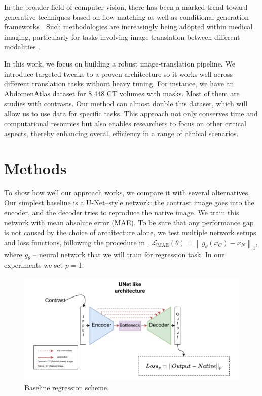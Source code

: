 \documentclass{article}
\begin{document}
In the broader field of computer vision, there has been a marked trend toward generative techniques based on flow matching \citep{albergo2022building, bilovs2021neural} as well as conditional generation frameworks \citep{lipman2022flow, tong2023improving}. Such methodologies are increasingly being adopted within medical imaging, particularly for tasks involving image translation between different modalities \citep{yazdani2025flow, reynaud2025echoflow}.

In this work, we focus on building a robust image‐translation pipeline. We introduce targeted tweaks to a proven architecture so it works well across different translation tasks without heavy tuning. 
For instance, we have an AbdomenAtlas \citep{li2024abdomenatlas} dataset for 8,448 CT volumes with masks. Most of them are studies with contrasts. Our method can almost double this dataset, which will allow us to use data for specific tasks. This approach not only conserves time and computational resources but also enables researchers to focus on other critical aspects, thereby enhancing overall efficiency in a range of clinical scenarios. 

\section{Methods}
To show how well our approach works, we compare it with several alternatives.
Our simplest baseline is a U-Net–style network: the contrast image goes into the encoder, and the decoder tries to reproduce the native image. We train this network with mean absolute error (MAE). To be sure that any performance gap is not caused by the choice of architecture alone, we test multiple network setups and loss functions, following the procedure in \citep{article_dual}.
$
    \mathcal{L}_{\text{MAE}}(\theta) = 
      \left\lVert g_{\theta}(x_C) - x_N\right\rVert_{1},
    \label{eq:baseline_loss}
$where $g_{\theta}$ -- neural network that we will train for regression task. In our experiments we set $p=1$.
\begin{figure}[h!]
  \centering
  \includegraphics[width=0.8\linewidth]{images/pixel2pixel.pdf}
  \caption{Baseline regression scheme.}
\end{figure}
\end{document}

